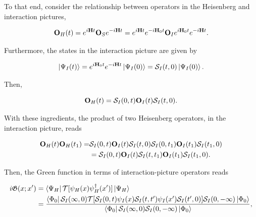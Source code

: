 \documentclass{homework}
\begin{document}
To that end, consider the relationship between operators in the Heisenberg and interaction pictures,

\begin{equation}
    {\bf O}_{H}(t) = e^{i {\bf H} t} {\bf O}_{S} e^{-i {\bf H} t} = e^{i {\bf H} t} e^{-i {\bf H}_0 t} {\bf O}_{I} e^{i {\bf H}_0 t} e^{-i {\bf H} t}.
\end{equation}

Furthermore, the states in the interaction picture are given by 

\begin{equation}
    \ket{\Psi_I(t)} = e^{i{\bf H}_0 t} e^{-i {\bf H}t} \ket{\Psi_I(0)} = \mathcal{S}_{I}(t,0) \ket{\Psi_I(0)}.
\end{equation}

Then, 

\begin{equation}
    {\bf O}_{H}(t) = \mathcal{S}_{I}(0,t) {\bf O}_{I}(t) \mathcal{S}_{I}(t,0). 
\end{equation}

With these ingredients, the product of two Heisenberg operators, in the interaction picture, reads

\begin{equation}
    \begin{split}
        {\bf O}_{H}(t) {\bf O}_{H}(t_1) =& \mathcal{S}_{I}(0,t) {\bf O}_{I}(t) \mathcal{S}_{I}(t,0)  \mathcal{S}_{I}(0,t_1) {\bf O}_{I}(t_1) \mathcal{S}_{I}(t_1,0) \\
        &= \mathcal{S}_{I}(0,t) {\bf O}_{I}(t) \mathcal{S}_{I}(t,t_1) {\bf O}_{I}(t_1) \mathcal{S}_{I}(t_1,0).
    \end{split}
\end{equation}

Then, the Green function in terms of interaction-picture operators reads

\begin{equation}
\begin{split}
    i \mathfrak{G}(x; x') &= \bra{\Psi_H} \mathcal{T} [\psi_{H}(x) \psi^\dagger_{H}(x')] \ket{\Psi_H} \\
    &= \frac{\bra{\Phi_0} \mathcal{S}_I(\infty, 0) \mathcal{T} [\mathcal{S}_I(0, t) \psi_{I}(x) \mathcal{S}_I(t, t') \psi_{I}(x') \mathcal{S}_I(t', 0) ] \mathcal{S}_I(0, -\infty)\ket{\Phi_0}}{\bra{\Phi_0} \mathcal{S}_I(\infty, 0)\mathcal{S}_I(0, -\infty)\ket{\Phi_0}},
\end{split}
\end{equation}
\end{document}
